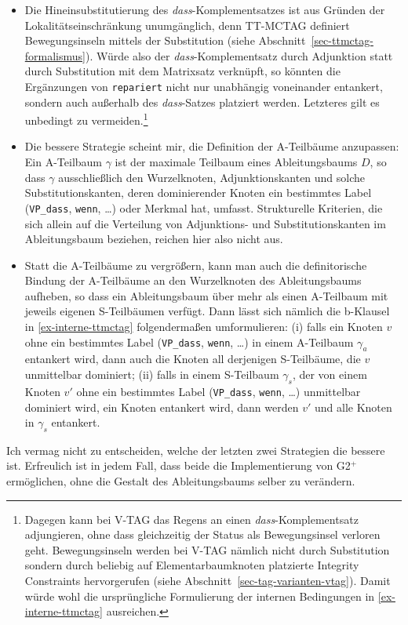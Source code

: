 \begin{itemize}
  \item Die Hineinsubstitutierung des {\it dass}-Komplementsatzes ist aus Gründen der Lokalitätseinschränkung unumgänglich, denn TT-MCTAG definiert Bewegungsinseln mittels der Substitution (siehe Abschnitt~\ref{sec-ttmctag-formalismus}). Würde also der {\it dass}-Komplementsatz durch Adjunktion statt durch Substitution mit dem Matrixsatz verknüpft, so könnten die Ergänzungen von {\tt repariert} nicht nur unabhängig voneinander entankert, sondern auch au\ss erhalb des {\it dass}-Satzes platziert werden. Letzteres gilt es unbedingt zu vermeiden.\footnote{Dagegen kann bei V-TAG das Regens an einen {\it dass}-Komplementsatz adjungieren, ohne dass gleichzeitig der Status als Bewegungsinsel verloren geht. Bewegungsinseln werden bei V-TAG nämlich nicht durch Substitution sondern durch beliebig auf Elementarbaumknoten platzierte Integrity Constraints hervorgerufen (siehe Abschnitt~\ref{sec-tag-varianten-vtag}). Damit würde wohl die ursprüngliche Formulierung der internen Bedingungen in \ref{ex-interne-ttmctag} ausreichen.}
  \item Die bessere Strategie scheint mir, die Definition der A-Teilbäume anzupassen: Ein A-Teilbaum $\gamma$ ist der maximale Teilbaum eines Ableitungsbaums $D$, so dass $\gamma$ ausschlie\ss lich den Wurzelknoten, Adjunktionskanten und solche Substitutionskanten, deren dominierender Knoten ein bestimmtes Label ({\tt VP\_dass}, {\tt wenn}, \ldots) oder Merkmal hat, umfasst. Strukturelle Kriterien, die sich allein auf die Verteilung von Adjunktions- und Substitutionskanten im Ableitungsbaum beziehen, reichen hier also nicht aus.%
  \item Statt die A-Teilbäume zu vergrö\ss ern, kann man auch die definitorische Bindung der A-Teilbäume an den Wurzelknoten des Ableitungsbaums aufheben, so dass ein Ableitungsbaum über mehr als einen A-Teilbaum mit jeweils eigenen S-Teilbäumen verfügt. Dann lässt sich nämlich die b-Klausel in \ref{ex-interne-ttmctag} folgenderma\ss en umformulieren: (i) falls ein Knoten $v$ ohne ein bestimmtes Label ({\tt VP\_dass}, {\tt wenn}, \ldots) in einem A-Teilbaum $\gamma_a$ entankert wird, dann auch die Knoten all derjenigen S-Teilbäume, die $v$ unmittelbar dominiert; (ii) falls in einem S-Teilbaum $\gamma_s$, der von einem Knoten $v'$ ohne ein bestimmtes Label ({\tt VP\_dass}, {\tt wenn}, \ldots) unmittelbar dominiert wird, ein Knoten entankert wird, dann werden $v'$ und alle Knoten in $\gamma_s$ entankert.  
\end{itemize} 
Ich vermag nicht zu entscheiden, welche der letzten zwei Strategien die bessere ist. Erfreulich ist in jedem Fall, dass beide die Implementierung von G2$^+$ ermöglichen, ohne die Gestalt des Ableitungsbaums selber zu verändern. 

